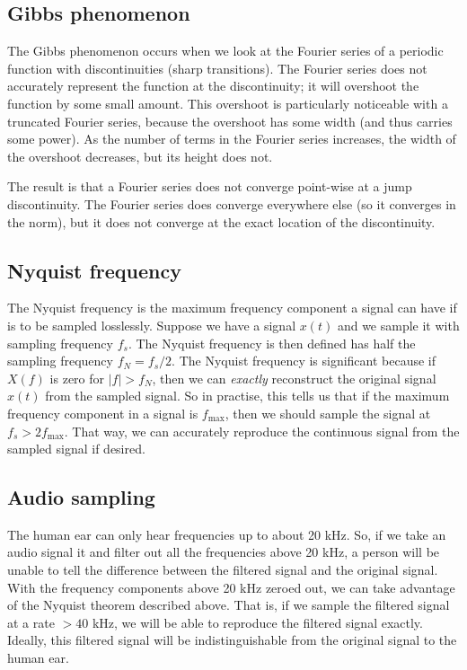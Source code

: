 \documentclass[twocolumn]{myarticle}
\begin{document}
\subsection{Gibbs phenomenon}
\label{subsec:gibbs_phenomenon}

The Gibbs phenomenon occurs when we look at the Fourier series of a periodic function with discontinuities (sharp transitions).
The Fourier series does not accurately represent the function at the discontinuity; it will overshoot the function by some small amount.
This overshoot is particularly noticeable with a truncated Fourier series, because the overshoot has some width (and thus carries some power).
As the number of terms in the Fourier series increases, the width of the overshoot decreases, but its height does not.

The result is that a Fourier series does not converge point-wise at a jump discontinuity.
The Fourier series does converge everywhere else (so it converges in the norm), but it does not converge at the exact location of the discontinuity.

\subsection{Nyquist frequency}
\label{subsec:nyquist_frequency}

The Nyquist frequency is the maximum frequency component a signal can have if is to be sampled losslessly.
Suppose we have a signal $ x(t) $ and we sample it with sampling frequency $ f_s $.
The Nyquist frequency is then defined has half the sampling frequency $ f_N = f_s/2 $.
The Nyquist frequency is significant because if $ X(f) $ is zero for $ |f| > f_N $, then we can \emph{exactly} reconstruct the original signal $ x(t) $ from the sampled signal.
So in practise, this tells us that if the maximum frequency component in a signal is $ f_\text{max} $, then we should sample the signal at $ f_s > 2 f_\text{max} $.
That way, we can accurately reproduce the continuous signal from the sampled signal if desired.

\subsection{Audio sampling}
\label{subsec:audio_sampling}

The human ear can only hear frequencies up to about 20 kHz.
So, if we take an audio signal it and filter out all the frequencies above 20 kHz, a person will be unable to tell the difference between the filtered signal and the original signal.
With the frequency components above 20 kHz zeroed out, we can take advantage of the Nyquist theorem described above.
That is, if we sample the filtered signal at a rate $ >40 $ kHz, we will be able to reproduce the filtered signal exactly.
Ideally, this filtered signal will be indistinguishable from the original signal to the human ear.
\end{document}
